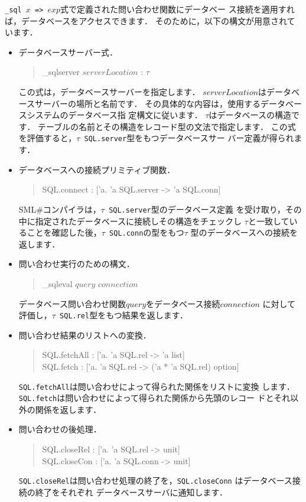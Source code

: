 \documentclass{jbook}
\newcommand{\smlsharp}{SML\#}
\newenvironment{program}{\begin{tt}\begin{quote}}{\end{quote}\end{tt}}
\begin{document}
\ifx\jp%
	{\tt \_sql $x$ => $exp$}式で定義された問い合わせ関数にデータベー
ス接続を適用すれば，データベースをアクセスできます．
	そのために，以下の構文が用意されています．
\begin{itemize}
\item データベースサーバー式．
\begin{program}
\_sqlserver $serverLocation$ : $\tau$
\end{program}
	この式は，データベースサーバーを指定します．
	$serverLocation$はデータベースサーバーの場所と名前です．
	その具体的な内容は，使用するデータベースシステムのデータベース指
定構文に従います．
	$\tau$はデータベースの構造です．
	テーブルの名前とその構造をレコード型の文法で指定します．
	この式を評価すると，{\tt $\tau$ SQL.server}型をもつデータベースサー
バー定義が得られます．
\item データベースへの接続プリミティブ関数．
\begin{program}
SQL.connect : ['a. 'a SQL.server -> 'a SQL.conn]
\end{program}
	\smlsharp{}コンパイラは，{\tt $\tau$ SQL.server}型のデータベース定義
を受け取り，その中に指定されたデータベースに接続しその構造をチェックし
$\tau$と一致していることを確認した後，{\tt $\tau$ SQL.conn}の型をもつ$\tau$
型のデータベースへの接続を返します．
	
\item 問い合わせ実行のための構文．
\begin{program}
\_sqleval $query$ $connection$
\end{program}
	データベース問い合わせ関数$query$をデータベース接続$connection$
に対して評価し，{\tt $\tau$ SQL.rel}型をもつ結果を返します．

\item 問い合わせ結果のリストへの変換．
\begin{program}
SQL.fetchAll : ['a. 'a SQL.rel -> 'a list]\\
SQL.fetch : ['a. 'a SQL.rel -> ('a * 'a SQL.rel) option]
\end{program}
	{\tt SQL.fetchAll}は問い合わせによって得られた関係をリストに変換
します．
	{\tt SQL.fetch}は問い合わせによって得られた関係から先頭のレコー
ドとそれ以外の関係を返します．
\item 問い合わせの後処理．
\begin{program}
SQL.closeRel : ['a. 'a SQL.rel -> unit]\\
SQL.closeCon : ['a. 'a SQL.conn -> unit]
\end{program}
	{\tt SQL.closeRel}は問い合わせ処理の終了を，{\tt SQL.closeConn}
はデータベース接続の終了をそれぞれ
データベースサーバに通知します．
\end{itemize}
\end{document}
